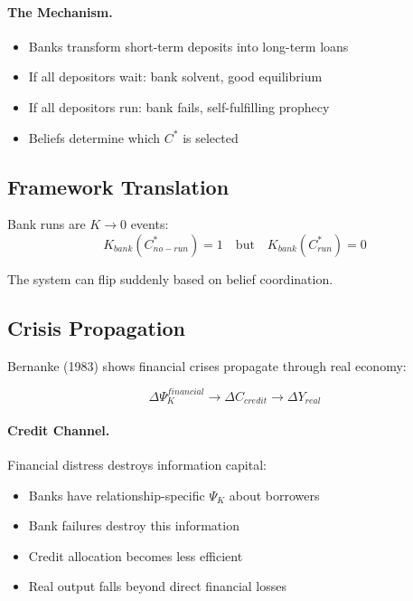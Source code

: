 \paragraph{The Mechanism.}
\begin{itemize}
    \item Banks transform short-term deposits into long-term loans
    \item If all depositors wait: bank solvent, good equilibrium
    \item If all depositors run: bank fails, self-fulfilling prophecy
    \item Beliefs determine which $C^*$ is selected
\end{itemize}

\subsection{Framework Translation}

Bank runs are $K \to 0$ events:
\begin{equation}
K_{bank}(C^*_{no-run}) = 1 \quad \text{but} \quad K_{bank}(C^*_{run}) = 0
\end{equation}

The system can flip suddenly based on belief coordination.

\subsection{Crisis Propagation}

Bernanke (1983) shows financial crises propagate through real economy:

\begin{equation}
\boxed{
\Delta \Psi_K^{financial} \to \Delta C_{credit} \to \Delta Y_{real}
}
\label{eq:bernanke}
\end{equation}

\paragraph{Credit Channel.}
Financial distress destroys information capital:
\begin{itemize}
    \item Banks have relationship-specific $\Psi_K$ about borrowers
    \item Bank failures destroy this information
    \item Credit allocation becomes less efficient
    \item Real output falls beyond direct financial losses
\end{itemize}

